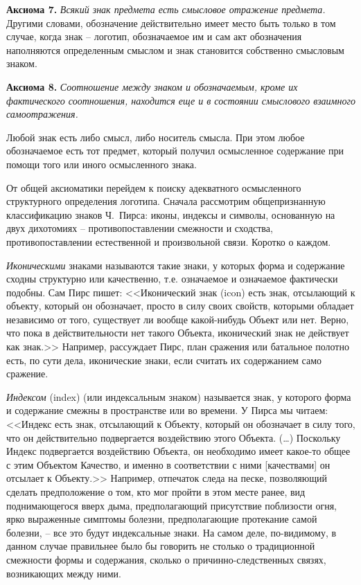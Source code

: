 \textbf{Аксиома 7.} \emph{Всякий знак предмета есть смысловое отражение
    предмета.} Другими словами, обозначение действительно имеет место
  быть только в том случае, когда знак -- логотип, обозначаемое им и
  сам акт обозначения наполняются определенным смыслом и знак становится
  собственно смысловым знаком.

\textbf{Аксиома 8.} \emph{Соотношение между знаком и обозначаемым, кроме
    их фактического соотношения, находится еще и в состоянии смыслового
    взаимного самоотражения.}

Любой знак есть либо смысл, либо носитель смысла. При этом любое обозначаемое
есть тот предмет, который получил осмысленное содержание при помощи того или
иного осмысленного знака.

От общей аксиоматики перейдем к поиску адекватного осмысленного структурного
определения логотипа. Сначала рассмотрим общепризнанную  классификацию знаков
Ч.~Пирса: иконы, индексы и символы,  основанную на двух дихотомиях --
противопоставлении смежности и сходства, противопоставлении естественной
и произвольной связи\autocite[322]{jakobson1985}. Коротко о каждом.

\emph{Иконическими} знаками называются такие знаки, у которых форма
  и содержание сходны структурно или качественно, т.е. означаемое
  и означаемое фактически подобны. Сам Пирс пишет: <<Иконический знак (icon)
  есть знак, отсылающий к объекту, который он обозначает, просто в силу
  своих свойств, которыми обладает независимо от того, существует ли
  вообще какой-нибудь Объект или нет. Верно, что пока в действительности
  нет такого Объекта, иконический знак не действует как знак.>> \autocite[][185]{jakobson1985}
  Например, рассуждает Пирс, план сражения или батальное полотно есть,
  по сути дела, иконические знаки, если считать их содержанием само сражение.

\emph{Индексом} (index) (или индексальным знаком) называется знак, у которого
  форма и содержание смежны в пространстве или во времени.
  У Пирса мы читаем: <<Индекс есть знак, отсылающий к Объекту, который он
  обозначает в силу того, что он действительно подвергается воздействию
  этого Объекта. (\ldots) Поскольку Индекс подвергается воздействию
  Объекта, он необходимо имеет какое-то общее с этим Объектом Качество,
  и именно в соответствии с ними [качествами] он отсылает к Объекту.>> \autocite[][186]{jakobson1985}
  Например, отпечаток следа на песке, позволяющий сделать предположение о том,
  кто мог пройти в этом месте ранее, вид поднимающегося вверх дыма,
  предполагающий присутствие поблизости огня, ярко выраженные симптомы болезни,
  предполагающие протекание самой болезни, -- все это будут индексальные знаки.
  На самом деле, по-видимому, в данном случае правильнее было бы говорить не
  столько о традиционной смежности формы и содержания, сколько о
  причинно-следственных связях, возникающих между ними.

